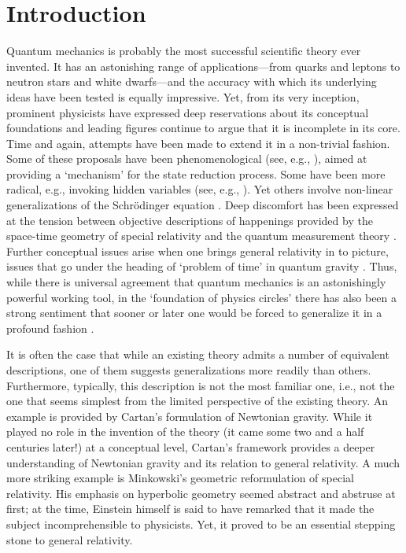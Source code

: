 \documentclass[12pt,aps,eqsecnum,tighten]{revtex4-2}
\begin{document}
\newpage

\section{Introduction}\label{sec1}

Quantum mechanics is probably the most successful scientific theory
ever invented. It has an astonishing range of applications---from
quarks and leptons to neutron stars and white dwarfs---and the
accuracy with which its underlying ideas have been tested is equally
impressive. Yet, from its very inception, prominent physicists have
expressed deep reservations about its conceptual foundations and
leading figures continue to argue that it is incomplete in its
core. Time and again, attempts have been made to extend it in a
non-trivial fashion. Some of these proposals have been
phenomenological (see, e.g., \cite{grw,pearle1,ggr}), aimed at
providing a `mechanism' for the state reduction process. Some have
been more radical, e.g., invoking hidden variables (see, e.g.,
\cite{jb1}). Yet others involve non-linear generalizations of the
Schr\"odinger equation \cite{birula,pearle2,weinberg}. Deep discomfort
has been expressed at the tension between objective descriptions of
happenings provided by the space-time geometry of special relativity
and the quantum measurement theory \cite{pearle3,jb2}. Further
conceptual issues arise when one brings general relativity in to
picture, issues that go under the heading of `problem of time' in
quantum gravity \cite{as,kk,ci1}. Thus, while there is universal
agreement that quantum mechanics is an astonishingly powerful working
tool, in the `foundation of physics circles' there has also been a
strong sentiment that sooner or later one would be forced to
generalize it in a profound fashion \cite{rp1,gh,ci2}.

It is often the case that while an existing theory admits a number of
equivalent descriptions, one of them suggests generalizations more
readily than others. Furthermore, typically, this description is not
the most familiar one, i.e., not the one that seems simplest from the
limited perspective of the existing theory. An example is provided by
Cartan's formulation of Newtonian gravity. While it played no role in
the invention of the theory (it came some two and a half centuries
later!) at a conceptual level, Cartan's framework provides a deeper
understanding of Newtonian gravity and its relation to general
relativity. A much more striking example is Minkowski's geometric
reformulation of special relativity.  His emphasis on hyperbolic
geometry seemed abstract and abstruse at first; at the time, Einstein
himself is said to have remarked that it made the subject
incomprehensible to physicists. Yet, it proved to be an essential
stepping stone to general relativity.
\end{document}
